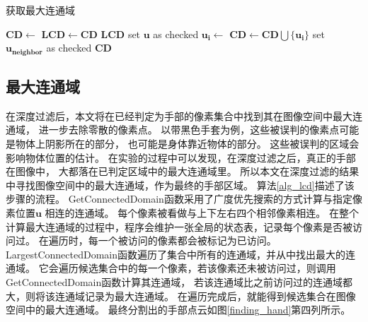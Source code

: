 \begin{algorithm}
    \caption{获取最大连通域}
    \label{alg_lcd}
    \begin{algorithmic}[1]
        \rm
                    \State $\bm{CD} \gets$ 
                        \State $\bm{LCD} \gets  \bm{CD}$
                    \EndIf
                \EndIf
            \EndFor
            \State \Return $\bm{LCD}$
        \EndFunction
            \State {}
            \State set $\bm{u}$ as checked
                \State $\bm{u_i} \gets$ 
                \State $\bm{CD} \gets \bm{CD} \bigcup \{\bm{u_i}\}$
                        \State {}
                        \State set $\bm{u_{neighbor}}$ as checked
                    \EndIf
                \EndFor
            \EndWhile
            \State \Return $\bm{CD}$
        \EndFunction
    \end{algorithmic}
\end{algorithm}
\subsection{最大连通域}
在深度过滤后，本文将在已经判定为手部的像素集合中找到其在图像空间中最大连通域，
进一步去除零散的像素点。
以带黑色手套为例，这些被误判的像素点可能是物体上阴影所在的部分，
也可能是身体靠近物体的部分。
这些被误判的区域会影响物体位置的估计。
在实验的过程中可以发现，在深度过滤之后，真正的手部在图像中，
大都落在已判定区域中的最大连通域里。
所以本文在深度过滤的结果中寻找图像空间中的最大连通域，作为最终的手部区域。
算法\ref{alg_lcd}描述了该步骤的流程。
GetConnectedDomain函数采用了广度优先搜索的方式计算与指定像素位置$\bm{u}$
相连的连通域。
每个像素被看做与上下左右四个相邻像素相连。
在整个计算最大连通域的过程中，程序会维护一张全局的状态表，记录每个像素是否被访问过。
在遍历时，每一个被访问的像素都会被标记为已访问。
LargestConnectedDomain函数遍历了集合中所有的连通域，并从中找出最大的连通域。
它会遍历候选集合中的每一个像素，若该像素还未被访问过，则调用GetConnectedDomain函数计算其连通域，
若该连通域比之前访问过的连通域都大，则将该连通域记录为最大连通域。
在遍历完成后，就能得到候选集合在图像空间中的最大连通域。
最终分割出的手部点云如图\ref{finding_hand}第四列所示。

